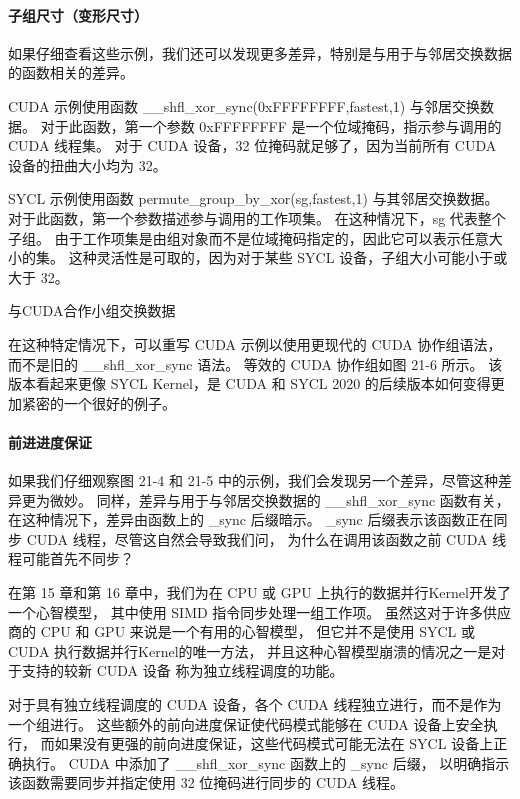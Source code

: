 \paragraph{子组尺寸（变形尺寸）}

如果仔细查看这些示例，我们还可以发现更多差异，特别是与用于与邻居交换数据的函数相关的差异。

CUDA 示例使用函数 \_\_shfl\_xor\_sync(0xFFFFFFFF,fastest,1) 与邻居交换数据。 
对于此函数，第一个参数 0xFFFFFFFF 是一个位域掩码，指示参与调用的 CUDA 线程集。 
对于 CUDA 设备，32 位掩码就足够了，因为当前所有 CUDA 设备的扭曲大小均为 32。

SYCL 示例使用函数 permute\_group\_by\_xor(sg,fastest,1) 与其邻居交换数据。 
对于此函数，第一个参数描述参与调用的工作项集。 在这种情况下，sg 代表整个子组。 
由于工作项集是由组对象而不是位域掩码指定的，因此它可以表示任意大小的集。 
这种灵活性是可取的，因为对于某些 SYCL 设备，子组大小可能小于或大于 32。

{\color{red} 与CUDA合作小组交换数据}

在这种特定情况下，可以重写 CUDA 示例以使用更现代的 CUDA 协作组语法，
而不是旧的 \_\_shfl\_xor\_sync 语法。 等效的 CUDA 协作组如图 21-6 所示。 
该版本看起来更像 SYCL Kernel，是 CUDA 和 SYCL 2020 的后续版本如何变得更加紧密的一个很好的例子。

\paragraph{前进进度保证}

如果我们仔细观察图 21-4 和 21-5 中的示例，我们会发现另一个差异，尽管这种差异更为微妙。 
同样，差异与用于与邻居交换数据的 \_\_shfl\_xor\_sync 函数有关，
在这种情况下，差异由函数上的 \_sync 后缀暗示。 
\_sync 后缀表示该函数正在同步 CUDA 线程，尽管这自然会导致我们问，
为什么在调用该函数之前 CUDA 线程可能首先不同步？

在第 15 章和第 16 章中，我们为在 CPU 或 GPU 上执行的数据并行Kernel开发了一个心智模型，
其中使用 SIMD 指令同步处理一组工作项。 
虽然这对于许多供应商的 CPU 和 GPU 来说是一个有用的心智模型，
但它并不是使用 SYCL 或 CUDA 执行数据并行Kernel的唯一方法，
并且这种心智模型崩溃的情况之一是对于支持的较新 CUDA 设备 称为独立线程调度的功能。

对于具有独立线程调度的 CUDA 设备，各个 CUDA 线程独立进行，而不是作为一个组进行。 
这些额外的前向进度保证使代码模式能够在 CUDA 设备上安全执行，
而如果没有更强的前向进度保证，这些代码模式可能无法在 SYCL 设备上正确执行。 
CUDA 中添加了 \_\_shfl\_xor\_sync 函数上的 \_sync 后缀，
以明确指示该函数需要同步并指定使用 32 位掩码进行同步的 CUDA 线程。

